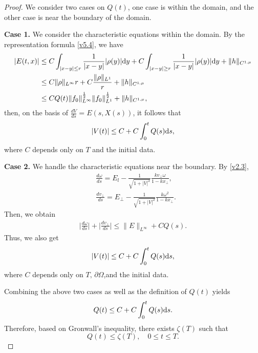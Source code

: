 \documentclass[11pt,reqno]{amsart}%
\theoremstyle{definition}
\theoremstyle{remark}
\begin{document}
\begin{proof}
We consider two cases on $Q(t)$, one case is within the domain, and the other case is near the boundary of the domain.
  
 {\bf Case 1.} We consider the characteristic equations within the domain.
By the representation formula  \eqref{v5.4}, we have
\begin{align}
|E(t,x)|&\leq C \int_{|x-y|\leq r}\frac{1}{|x-y|}|\rho(y)|{\rm d}y +C \int_{|x-y|\geq r}\frac{1}{|x-y|}|\rho(y)|{\rm d}y + \|h\|_{C^{1,\mu}}\nonumber\\
&\leq C\|\rho\|_{L^{\infty}}r+C\frac{\|\rho\|_{L^{1}}}{r}+ \|h\|_{C^{1,\mu}}\nonumber\\
&\leq C Q(t) \|f_{0}\|^{\frac{1}{2}}_{L^{\infty}}\|f_{0}\|^{\frac{1}{2}}_{L^{1}}+ \|h\|_{C^{1,\mu}},\nonumber
\end{align}
then, on the basis of $\frac{d V}{ds}= E(s,X(s))$, it follows that
\begin{align}
|V(t)|\leq C+C\int^{t}_{0}Q(s){\rm d}s,\nonumber
\end{align}
where $C$ depends only on $T$ and the initial data.
  
 {\bf Case 2.}  We handle the characteristic equations near the boundary. By \eqref{v2.3},
\begin{align}
&\frac{d \omega}{d s}=E_{l}-\frac{1}{\sqrt{1+|V|^{2}}}\frac{k v_{\bot}\omega}{1-kx_{\bot}},\nonumber\\
&\frac{d v_{\bot}}{d s}=E_{\bot}-\frac{1}{\sqrt{1+|V|^{2}}}\frac{k \omega^{2}}{1-kx_{\bot}}.\nonumber
\end{align}
Then, we obtain
\begin{align}
\big|\frac{d \omega}{d s}\big|+\big|\frac{d v_{\bot}}{d s}\big|\leq \|E\|_{L^{\infty}}+ CQ(s).\nonumber
\end{align}
Thus, we also get
\begin{align}
|V(t)|\leq C+C\int^{t}_{0}Q(s){\rm d}s,\nonumber
\end{align}
where $C$ depends only on $T,\,\partial\Omega$,and the initial data.

Combining the above two cases as well as the definition of $Q(t)$ yields
\begin{align}
Q(t)\leq C+C\int^{t}_{0}Q(s){\rm d}s.\nonumber
\end{align}
Therefore, based on Gronwall's inequality, there exists $\zeta(T)$ such that
$$Q(t)\leq \zeta(T),\quad 0\leq t\leq T.$$
\end{proof}
\end{document}
